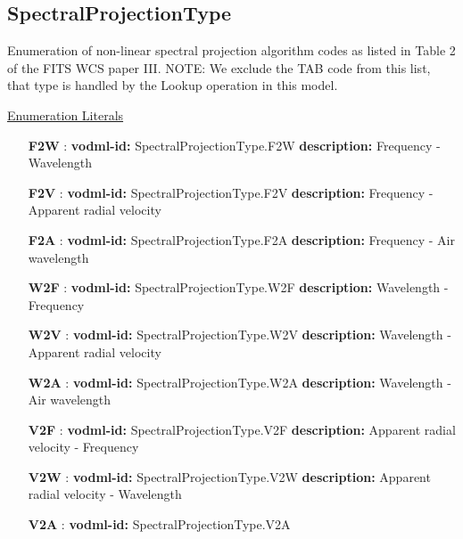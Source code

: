   \subsection{SpectralProjectionType}
  \label{sect:SpectralProjectionType}

  Enumeration of non-linear spectral projection algorithm codes as listed in Table 2 of the FITS WCS paper III. NOTE: We exclude the TAB code from this list, that type is handled by the Lookup operation in this model.

  \noindent \underline{Enumeration Literals}
  \vspace{-\parsep}
  \small
  \begin{itemize}
  
    \item[\textbf{F2W}]: \textbf{vodml-id:} SpectralProjectionType.F2W \newline
          \textbf{description:} Frequency - Wavelength
    \item[\textbf{F2V}]: \textbf{vodml-id:} SpectralProjectionType.F2V \newline
          \textbf{description:} Frequency - Apparent radial velocity
    \item[\textbf{F2A}]: \textbf{vodml-id:} SpectralProjectionType.F2A \newline
          \textbf{description:} Frequency - Air wavelength
    \item[\textbf{W2F}]: \textbf{vodml-id:} SpectralProjectionType.W2F \newline
          \textbf{description:} Wavelength - Frequency
    \item[\textbf{W2V}]: \textbf{vodml-id:} SpectralProjectionType.W2V \newline
          \textbf{description:} Wavelength - Apparent radial velocity
    \item[\textbf{W2A}]: \textbf{vodml-id:} SpectralProjectionType.W2A \newline
          \textbf{description:} Wavelength - Air wavelength
    \item[\textbf{V2F}]: \textbf{vodml-id:} SpectralProjectionType.V2F \newline
          \textbf{description:} Apparent radial velocity - Frequency
    \item[\textbf{V2W}]: \textbf{vodml-id:} SpectralProjectionType.V2W \newline
          \textbf{description:} Apparent radial velocity - Wavelength
    \item[\textbf{V2A}]: \textbf{vodml-id:} SpectralProjectionType.V2A \newline

\end{itemize}

